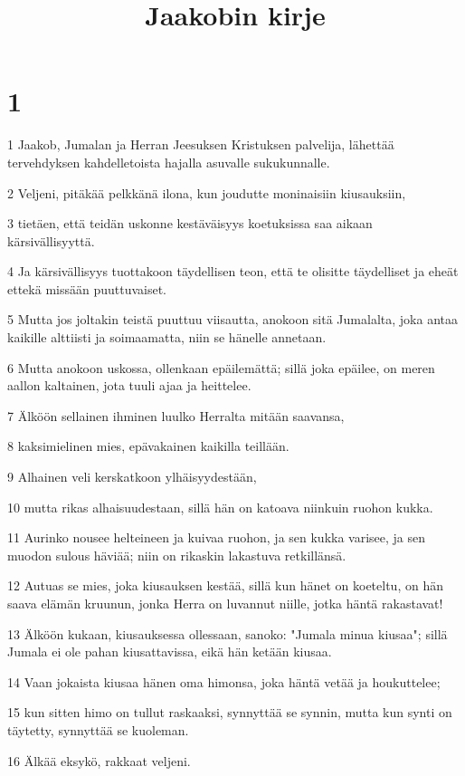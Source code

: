 

\title{Jaakobin kirje}


\chapter{1}

\par 1 Jaakob, Jumalan ja Herran Jeesuksen Kristuksen palvelija, lähettää tervehdyksen kahdelletoista hajalla asuvalle sukukunnalle.
\par 2 Veljeni, pitäkää pelkkänä ilona, kun joudutte moninaisiin kiusauksiin,
\par 3 tietäen, että teidän uskonne kestäväisyys koetuksissa saa aikaan kärsivällisyyttä.
\par 4 Ja kärsivällisyys tuottakoon täydellisen teon, että te olisitte täydelliset ja eheät ettekä missään puuttuvaiset.
\par 5 Mutta jos joltakin teistä puuttuu viisautta, anokoon sitä Jumalalta, joka antaa kaikille alttiisti ja soimaamatta, niin se hänelle annetaan.
\par 6 Mutta anokoon uskossa, ollenkaan epäilemättä; sillä joka epäilee, on meren aallon kaltainen, jota tuuli ajaa ja heittelee.
\par 7 Älköön sellainen ihminen luulko Herralta mitään saavansa,
\par 8 kaksimielinen mies, epävakainen kaikilla teillään.
\par 9 Alhainen veli kerskatkoon ylhäisyydestään,
\par 10 mutta rikas alhaisuudestaan, sillä hän on katoava niinkuin ruohon kukka.
\par 11 Aurinko nousee helteineen ja kuivaa ruohon, ja sen kukka varisee, ja sen muodon sulous häviää; niin on rikaskin lakastuva retkillänsä.
\par 12 Autuas se mies, joka kiusauksen kestää, sillä kun hänet on koeteltu, on hän saava elämän kruunun, jonka Herra on luvannut niille, jotka häntä rakastavat!
\par 13 Älköön kukaan, kiusauksessa ollessaan, sanoko: "Jumala minua kiusaa"; sillä Jumala ei ole pahan kiusattavissa, eikä hän ketään kiusaa.
\par 14 Vaan jokaista kiusaa hänen oma himonsa, joka häntä vetää ja houkuttelee;
\par 15 kun sitten himo on tullut raskaaksi, synnyttää se synnin, mutta kun synti on täytetty, synnyttää se kuoleman.
\par 16 Älkää eksykö, rakkaat veljeni.
